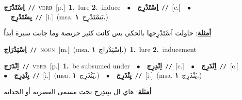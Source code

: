 \documentclass[10pt,a4paper,twoside]{article} %
\begin{document}
\begin{multicols}{2}
{\setlength\topsep{0pt}\textbf{\foreignlanguage{arabic}{اِسْتَدْرَج}}\ {\color{gray}\texttt{//}\color{black}}\ \textsc{verb}\ [p.]\ \textbf{1.}~lure  \textbf{2.}~induce\ \ $\bullet$\ \ \setlength\topsep{0pt}\textbf{\foreignlanguage{arabic}{اِسْتَدْرِج}}\ {\color{gray}\texttt{//}\color{black}}\ [c.]\ \ $\bullet$\ \ \setlength\topsep{0pt}\textbf{\foreignlanguage{arabic}{يِسْتَدْرِج}}\ {\color{gray}\texttt{//}\color{black}}\ [i.]\ \color{gray}(msa. \foreignlanguage{arabic}{يَسْتَدْرِج}~\foreignlanguage{arabic}{\textbf{١.}})\color{black}\  \begin{flushright}\color{gray}\foreignlanguage{arabic}{\textbf{\underline{\foreignlanguage{arabic}{أمثلة}}}: حاولت اَسْتَدْرِجها بالحكي بس كانت كثير حريصة وما جابت سيرة أبداً}\end{flushright}\color{black}} \vspace{2mm}

{\setlength\topsep{0pt}\textbf{\foreignlanguage{arabic}{اِسْتِدْرَاج}}\ {\color{gray}\texttt{//}\color{black}}\ \textsc{noun}\ [m.]\ \color{gray}(msa. \foreignlanguage{arabic}{اِسْتِدْراج}~\foreignlanguage{arabic}{\textbf{١.}})\color{black}\ \textbf{1.}~lure  \textbf{2.}~inducement\ } \vspace{2mm}

{\setlength\topsep{0pt}\textbf{\foreignlanguage{arabic}{اِنْدَرَج}}\ {\color{gray}\texttt{//}\color{black}}\ \textsc{verb}\ [p.]\ \textbf{1.}~be subsumed under\ \ $\bullet$\ \ \setlength\topsep{0pt}\textbf{\foreignlanguage{arabic}{اِنْدِرِج}}\ {\color{gray}\texttt{//}\color{black}}\ [c.]\ \ $\bullet$\ \ \setlength\topsep{0pt}\textbf{\foreignlanguage{arabic}{اِنْدَرِج}}\ {\color{gray}\texttt{//}\color{black}}\ [c.]\ \ $\bullet$\ \ \setlength\topsep{0pt}\textbf{\foreignlanguage{arabic}{يِنْدِرِج}}\ {\color{gray}\texttt{//}\color{black}}\ [i.]\ \color{gray}(msa. \foreignlanguage{arabic}{يَنْدَرِج}~\foreignlanguage{arabic}{\textbf{١.}})\color{black}\ \ $\bullet$\ \ \setlength\topsep{0pt}\textbf{\foreignlanguage{arabic}{يِنْدَرِج}}\ {\color{gray}\texttt{//}\color{black}}\ [i.]\ \color{gray}(msa. \foreignlanguage{arabic}{يَنْدَرِج}~\foreignlanguage{arabic}{\textbf{١.}})\color{black}\  \begin{flushright}\color{gray}\foreignlanguage{arabic}{\textbf{\underline{\foreignlanguage{arabic}{أمثلة}}}: هاي ال بتِندِرج تحت مسمى العصرية أو الحداثة}\end{flushright}\color{black}} \vspace{2mm}


\end{multicols}
\end{document}
